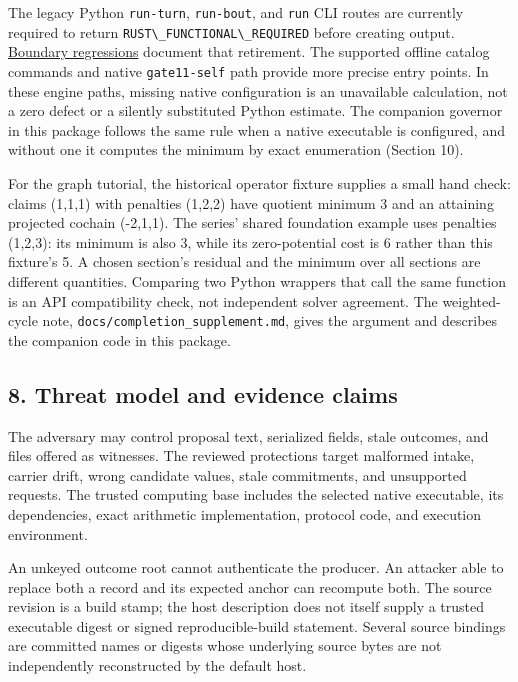 \documentclass[
  11pt,
]{article}
\newcommand{\passthrough}[1]{#1}
\begin{document}
The legacy Python \passthrough{\lstinline!run-turn!},
\passthrough{\lstinline!run-bout!}, and \passthrough{\lstinline!run!}
CLI routes are currently required to return
\passthrough{\lstinline!RUST\_FUNCTIONAL\_REQUIRED!} before creating
output.
\href{https://github.com/dbccpage/the_symbol_game/blob/52cb5457f6c485ba548cfd292f6012a941ed22cf/symbol_game/tests/test_functional_boundary.py}{Boundary
regressions} document that retirement. The supported offline catalog
commands and native \passthrough{\lstinline!gate11-self!} path provide
more precise entry points. In these engine paths, missing native
configuration is an unavailable calculation, not a zero defect or a
silently substituted Python estimate. The companion governor in this
package follows the same rule when a native executable is configured,
and without one it computes the minimum by exact enumeration (Section
10).

For the graph tutorial, the historical operator fixture supplies a small
hand check: claims (1,1,1) with penalties (1,2,2) have quotient minimum
3 and an attaining projected cochain (-2,1,1). The series' shared
foundation example uses penalties (1,2,3): its minimum is also 3, while
its zero-potential cost is 6 rather than this fixture's 5. A chosen
section's residual and the minimum over all sections are different
quantities. Comparing two Python wrappers that call the same function is
an API compatibility check, not independent solver agreement. The
weighted-cycle note, \nolinkurl{docs/completion_supplement.md}, gives
the argument and describes the companion code in this package.

\subsection{8. Threat model and evidence
claims}\label{threat-model-and-evidence-claims}

The adversary may control proposal text, serialized fields, stale
outcomes, and files offered as witnesses. The reviewed protections
target malformed intake, carrier drift, wrong candidate values, stale
commitments, and unsupported requests. The trusted computing base
includes the selected native executable, its dependencies, exact
arithmetic implementation, protocol code, and execution environment.

An unkeyed outcome root cannot authenticate the producer. An attacker
able to replace both a record and its expected anchor can recompute
both. The source revision is a build stamp; the host description does
not itself supply a trusted executable digest or signed
reproducible-build statement. Several source bindings are committed
names or digests whose underlying source bytes are not independently
reconstructed by the default host.
\end{document}
